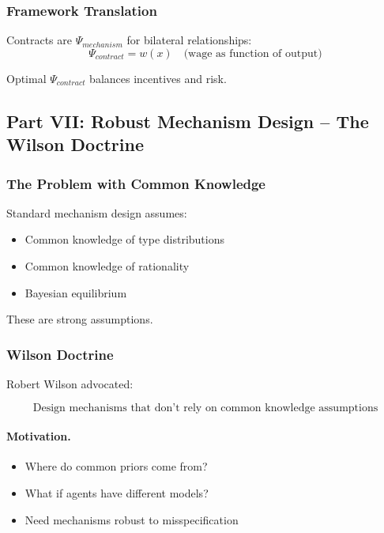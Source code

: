 \subsubsection{Framework Translation}

Contracts are $\Psi_{mechanism}$ for bilateral relationships:
\begin{equation}
\Psi_{contract} = w(x) \quad \text{(wage as function of output)}
\end{equation}

Optimal $\Psi_{contract}$ balances incentives and risk.

\subsection{Part VII: Robust Mechanism Design – The Wilson Doctrine}

\subsubsection{The Problem with Common Knowledge}

Standard mechanism design assumes:
\begin{itemize}
    \item Common knowledge of type distributions
    \item Common knowledge of rationality
    \item Bayesian equilibrium
\end{itemize}

These are strong assumptions.

\subsubsection{Wilson Doctrine}

Robert Wilson advocated:

\begin{equation}
\boxed{
\text{Design mechanisms that don't rely on common knowledge assumptions}
}
\label{eq:wilson}
\end{equation}

\paragraph{Motivation.}
\begin{itemize}
    \item Where do common priors come from?
    \item What if agents have different models?
    \item Need mechanisms robust to misspecification
\end{itemize}


